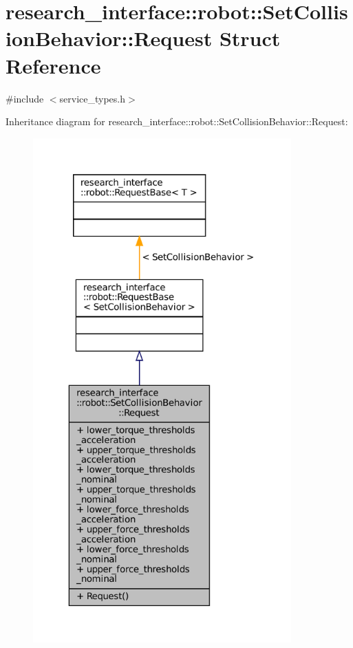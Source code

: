 \hypertarget{structresearch__interface_1_1robot_1_1SetCollisionBehavior_1_1Request}{}\section{research\+\_\+interface\+:\+:robot\+:\+:Set\+Collision\+Behavior\+:\+:Request Struct Reference}
\label{structresearch__interface_1_1robot_1_1SetCollisionBehavior_1_1Request}


{\ttfamily \#include $<$service\+\_\+types.\+h$>$}



Inheritance diagram for research\+\_\+interface\+:\+:robot\+:\+:Set\+Collision\+Behavior\+:\+:Request\+:
\nopagebreak
\begin{figure}[H]
\begin{center}
\leavevmode
\includegraphics[height=550pt]{structresearch__interface_1_1robot_1_1SetCollisionBehavior_1_1Request__inherit__graph}
\end{center}
\end{figure}


